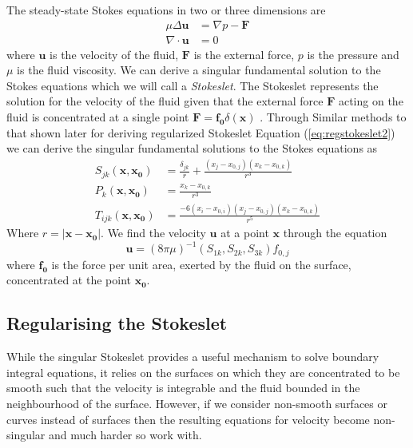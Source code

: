 The steady-state Stokes equations in two or three dimensions are
\begin{subequations}
\label{eq:StokesFlow}
\begin{align}
    \mu\Delta\boldsymbol{u} &= \nabla p - \boldsymbol{F} \label{eq:StokesFlow1} \\
    \nabla \cdot \boldsymbol{u} &= 0 \label{eq:StokesFlow2}
\end{align}
\end{subequations}
where $\mathbf{u}$ is the velocity of the fluid, $\mathbf{F}$ is the external force, $p$ is the pressure and $\mu$ is the fluid viscosity.
We can derive a singular fundamental solution to the Stokes equations which we will call a \textit{Stokeslet}. The Stokeslet represents the solution for the velocity of the fluid given that the external force $\mathbf{F}$ acting on the fluid is concentrated at a single point $\mathbf{F} = \mathbf{f_0}\delta(\mathbf{x})$ \cite{Hancock1953TheLiquids, Batchelor2000AnDynamics, Pozrikidis1992BoundaryFlow}.
Through Similar methods to that shown later for deriving regularized Stokeslet Equation (\cref{eq:regstokeslet2}) we can derive the singular fundamental solutions to the Stokes equations as
\begin{equation}
\label{eq:singularsolutions}
\begin{aligned}
    S_{j k}(\mathbf{x}, \mathbf{x_0}) &= \frac{\delta_{j k}}{r}+\frac{\left(x_{j}-x_{0,j}\right)\left(x_{k}-x_{0,k}\right)}{r^{3}} \\
    P_{k}(\mathbf{x}, \mathbf{x_0}) &= \frac{x_{k}-x_{0,k}}{r^{3}} \\
    T_{ijk}(\mathbf{x}, \mathbf{x_0}) &= \frac{-6\left(x_{i}-x_{0,i}\right)\left(x_{j}-x_{0,j}\right)\left(x_{k}-x_{0,k}\right)}{r^5}
\end{aligned}
\end{equation}
Where $r=|\mathbf{x}-\mathbf{x_0}|$. We find the velocity $\mathbf{u}$ at a point $\mathbf{x}$ through the equation
\begin{equation*}
    \mathbf{u} = (8 \pi \mu)^{-1} \left(S_{1k},S_{2k},S_{3k}\right)f_{0,j}
\end{equation*}
where $\mathbf{f_{0}}$ is the force per unit area, exerted by the fluid on the surface, concentrated at the point $\mathbf{x_0}$.


\subsection{Regularising the Stokeslet}
While the singular Stokeslet provides a useful mechanism to solve boundary integral equations, it relies on the surfaces on which they are concentrated to be smooth such that the velocity is integrable and the fluid bounded in the neighbourhood of the surface. However, if we consider non-smooth surfaces or curves instead of surfaces then the resulting equations for velocity become non-singular and much harder so work with.

